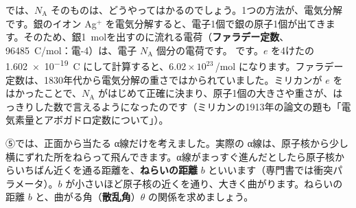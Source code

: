 では、$N_{\mathrm A}$ そのものは、どうやってはかるのでしょう。1つの方法が、電気分解です。銀のイオン Ag$^+$ を電気分解すると、電子1個で銀の原子1個が出てきます。そのため、銀\qty{1}{mol}を出すのに流れる電荷（\textbf{ファラデー定数}、\qty{96485}{C/mol}：電-4）は、電子 $N_{\mathrm A}$ 個分の電荷です。
です。$e$ を4けたの \qty{1.602e-19}{C} にして計算すると、$6.02\times10^{23}$\,/mol になります。ファラデー定数は、1830年代から電気分解の重さではかられていました。ミリカンが $e$ をはかったことで、$N_{\mathrm A}$ がはじめて正確に決まり、原子1個の大きさや重さが、はっきりした数で言えるようになったのです（ミリカンの1913年の論文の題も「電気素量とアボガドロ定数について」）。

\label{ph:原-1:sec8}
⑤では、正面から当たる α線だけを考えました。実際の α線は、原子核から少し横にずれた所をねらって飛んできます。α線がまっすぐ進んだとしたら原子核からいちばん近くを通る距離を、\textbf{ねらいの距離} $b$ といいます（専門書では衝突パラメータ）。$b$ が小さいほど原子核の近くを通り、大きく曲がります。ねらいの距離 $b$ と、曲がる角（\textbf{散乱角}）$\theta$ の関係を求めましょう。

